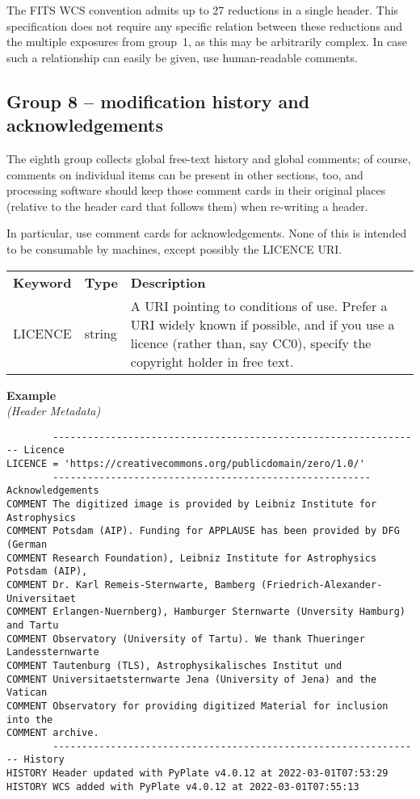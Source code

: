 \documentclass[11pt]{ivoa}
\newenvironment{fitsexample}[1]
{\bigskip\noindent\textbf{Example}\\\textit{(#1)\smallskip}}
{\medskip}
\begin{document}
The FITS WCS convention admits up to 27 reductions in a single header.
This specification does not require any specific relation between these
reductions and the multiple exposures from group~1, as this may be
arbitrarily complex.  In case such a relationship can easily be given,
use human-readable comments.

\subsection{Group 8 – modification history and acknowledgements}

The eighth group collects global free-text history and global comments; of
course, comments on individual items can be present in other sections,
too, and processing software should keep those comment cards in their
original places (relative to the header card that follows them) when
re-writing a header.

In particular, use comment cards for acknowledgements.  None of this is
intended to be consumable by machines, except possibly the LICENCE URI.

\begin{inlinetable}
\footnotesize
\begin{tabular}{llp{}}
\sptablerule
\textbf{Keyword}&\textbf{Type}&\textbf{Description}\\
\sptablerule
LICENCE &string    &A URI pointing to conditions of use.  Prefer a
URI widely known if possible, and if you use a licence (rather than, say
CC0), specify the copyright holder in free text.\\
\end{tabular}
\end{inlinetable}


\begin{fitsexample}{Header Metadata}
\begin{lstlisting}
        ---------------------------------------------------------------- Licence
LICENCE = 'https://creativecommons.org/publicdomain/zero/1.0/'
        ------------------------------------------------------- Acknowledgements
COMMENT The digitized image is provided by Leibniz Institute for Astrophysics
COMMENT Potsdam (AIP). Funding for APPLAUSE has been provided by DFG (German
COMMENT Research Foundation), Leibniz Institute for Astrophysics Potsdam (AIP),
COMMENT Dr. Karl Remeis-Sternwarte, Bamberg (Friedrich-Alexander-Universitaet
COMMENT Erlangen-Nuernberg), Hamburger Sternwarte (Unversity Hamburg) and Tartu
COMMENT Observatory (University of Tartu). We thank Thueringer Landessternwarte
COMMENT Tautenburg (TLS), Astrophysikalisches Institut und
COMMENT Universitaetsternwarte Jena (University of Jena) and the Vatican
COMMENT Observatory for providing digitized Material for inclusion into the
COMMENT archive.
        ---------------------------------------------------------------- History
HISTORY Header updated with PyPlate v4.0.12 at 2022-03-01T07:53:29
HISTORY WCS added with PyPlate v4.0.12 at 2022-03-01T07:55:13
\end{lstlisting}
\end{fitsexample}
\end{document}
